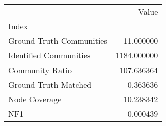 \begin{tabular}{lr}
\toprule
{} &        Value \\
Index                    &              \\
\midrule
Ground Truth Communities &    11.000000 \\
Identified Communities   &  1184.000000 \\
Community Ratio          &   107.636364 \\
Ground Truth Matched     &     0.363636 \\
Node Coverage            &    10.238342 \\
NF1                      &     0.000439 \\
\bottomrule
\end{tabular}
